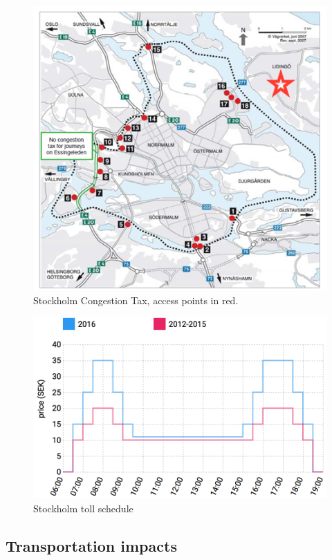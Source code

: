 \begin{figure}
    \includegraphics[width=5in]{../img/stockholm-map.png}
    \caption{Stockholm Congestion Tax, access points in red. \citep{transportstyrelsen2015}}
    \label{fig:stockholm-map}
\end{figure}

\begin{figure}
    \includegraphics[width=4.5in]{../img/stockholm-prices.png}
    \caption{Stockholm toll schedule }
    \label{fig:stockholm-prices}
\end{figure}

\subsection{Transportation impacts}

